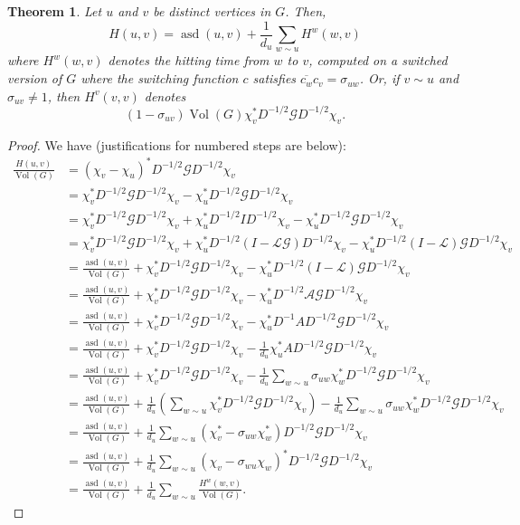 \documentclass{article}
\newtheorem{thm}{Theorem}
\theoremstyle{definition}
\DeclareMathOperator{\asd}{asd}
\DeclareMathOperator{\vol}{Vol}
\newcommand{\lap}{\mathcal{L}}
\newcommand{\normadj}{\mathcal{A}}
\newcommand{\green}{\mathcal{G}}
\begin{document}
\begin{thm}
Let $u$ and $v$ be distinct vertices in $G$. Then,
$$
H(u, v) = \asd(u, v) + \frac{1}{d_u} \sum_{w \sim u} H^w(w, v)
$$
where $H^w(w, v)$ denotes the hitting time from $w$ to $v$, computed on a switched version of $G$ where the switching function $c$ satisfies $\overline{c_w}c_v = \sigma_{uw}$. Or, if $v \sim u$ and $\sigma_{uv} \neq 1$, then $H^v(v, v)$ denotes 
$$
(1 - \sigma_{uv}) \vol(G) \chi_v^* D^{-1/2} \green D^{-1/2} \chi_v.
$$  
\end{thm}
\begin{proof}
We have (justifications for numbered steps are below):
\begin{align}
\frac{H(u, v)}{\vol(G)} 
&= (\chi_v - \chi_u)^* D^{-1/2} \green D^{-1/2} \chi_v \nonumber \\
&= \chi_v^* D^{-1/2} \green D^{-1/2} \chi_v - \chi_u^* D^{-1/2} \green D^{-1/2} \chi_v \nonumber \\
&= \chi_v^* D^{-1/2} \green D^{-1/2} \chi_v + \chi_u^* D^{-1/2} I D^{-1/2} \chi_v - \chi_u^* D^{-1/2} \green D^{-1/2} \chi_v \nonumber \\
&= \chi_v^* D^{-1/2} \green D^{-1/2} \chi_v + \chi_u^* D^{-1/2} (I -\lap \green) D^{-1/2} \chi_v - \chi_u^* D^{-1/2} (I - \lap) \green D^{-1/2} \chi_v \nonumber \\
&= \frac{\asd(u, v)}{\vol(G)} + \chi_v^* D^{-1/2} \green D^{-1/2} \chi_v - \chi_u^* D^{-1/2} (I - \lap) \green D^{-1/2} \chi_v \label{eqn:lap and green to asd} \\
&= \frac{\asd(u, v)}{\vol(G)} + \chi_v^* D^{-1/2} \green D^{-1/2} \chi_v - \chi_u^* D^{-1/2} \normadj \green D^{-1/2} \chi_v \nonumber \\
&= \frac{\asd(u, v)}{\vol(G)} + \chi_v^* D^{-1/2} \green D^{-1/2} \chi_v - \chi_u^* D^{-1} A D^{-1/2} \green D^{-1/2} \chi_v \nonumber \\
&= \frac{\asd(u, v)}{\vol(G)} + \chi_v^* D^{-1/2} \green D^{-1/2} \chi_v - \frac{1}{d_u} \chi_u^* A D^{-1/2} \green D^{-1/2} \chi_v \nonumber \\
&= \frac{\asd(u, v)}{\vol(G)} + \chi_v^* D^{-1/2} \green D^{-1/2} \chi_v - \frac{1}{d_u} \sum_{w \sim u} \sigma_{uw} \chi_w^* D^{-1/2} \green D^{-1/2} \chi_v \label{eqn:adj to sum} \\
&= \frac{\asd(u, v)}{\vol(G)} + \frac{1}{d_u} \left( \sum_{w \sim u} \chi_v^* D^{-1/2} \green D^{-1/2} \chi_v \right) - \frac{1}{d_u} \sum_{w \sim u} \sigma_{uw} \chi_w^* D^{-1/2} \green D^{-1/2} \chi_v \nonumber \\
&= \frac{\asd(u, v)}{\vol(G)} + \frac{1}{d_u} \sum_{w \sim u} \left( \chi_v^* - \sigma_{uw} \chi_w^* \right) D^{-1/2} \green D^{-1/2} \chi_v \nonumber \\
&= \frac{\asd(u, v)}{\vol(G)} + \frac{1}{d_u} \sum_{w \sim u} \left( \chi_v - \sigma_{wu} \chi_w \right)^* D^{-1/2} \green D^{-1/2} \chi_v \nonumber \\
&= \frac{\asd(u, v)}{\vol(G)} + \frac{1}{d_u} \sum_{w \sim u} \frac{H^w(w, v)}{\vol(G)}. \nonumber
\end{align}


\end{proof}
\end{document}
